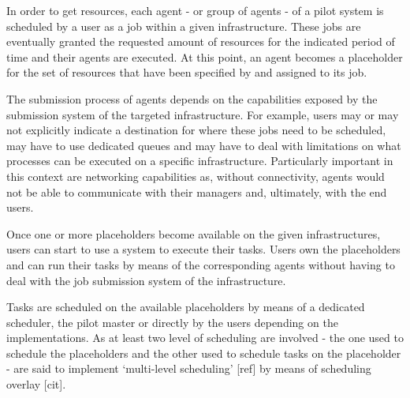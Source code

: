 \documentclass{sig-alternate}
\begin{document}
In order to get resources, each agent - or group of agents - of a
pilot system is scheduled by a user  as a job within a given
infrastructure. These jobs are eventually granted the requested amount
of resources for the indicated period of time and their agents are
executed. At this point, an agent becomes a placeholder for the set of
resources that have been specified by and assigned to its job.


The submission process of agents depends on the capabilities exposed
by the submission system of the targeted infrastructure. For example,
users may or may not explicitly indicate a destination for where these
jobs need to be scheduled, may have to use dedicated queues and may
have to deal with limitations on what processes can be executed on a
specific infrastructure. Particularly important in this context are
networking capabilities as, without connectivity, agents would not be
able to communicate with their managers and, ultimately, with the end
users.

Once one or more placeholders become available on the given
infrastructures, users can start to use a \pilotjob system to execute
their tasks. Users own the placeholders and can run their tasks by
means of the corresponding agents without having to deal with the job
submission system of the infrastructure. 


Tasks are scheduled on the available placeholders by means of a
dedicated scheduler, the pilot master or directly by the users
depending on the \pilotjobs implementations. As at least two level of
scheduling are involved - the one used to schedule the placeholders
and the other used to schedule tasks on the placeholder - \pilotjobs
are said to implement `multi-level scheduling' [ref] by means of
scheduling overlay [cit].
\end{document}
